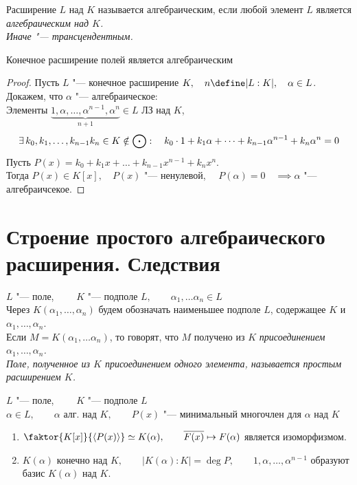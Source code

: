 \begin{definition}
	Расширение $ L $ над $ K $ называется алгебраическим, если любой элемент $ L $ является \it{алгебраическим} над $ K $. \\
	Иначе "--- \it{трансцендентным}.
\end{definition}

\begin{theorem}
	Конечное расширение полей является алгебраическим
\end{theorem}

\begin{proof}
	Пусть $ L $ "--- конечное расширение $ K, \quad n \define |L : K|, \quad \alpha \in L $. \\
	Докажем, что $ \alpha $ "--- алгебраическое: \\
	Элементы $ \underbrace{1, \alpha, \dots, \alpha^{n - 1}, \alpha^n}_{n + 1} \in L $ ЛЗ над $ K $, \ie
	$$ \exists\, k_0, k_1, \dots, k_{n - 1} k_n \in K \notin \bigodot : \quad k_0 \cdot 1 + k_1 \alpha + \dots + k_{n - 1}\alpha^{n - 1} + k_n\alpha^n = 0 $$
	Пусть $ P(x) = k_0 + k_1x + \dots + k_{n - 1}x^{n - 1} + k_nx^n $. \\
	Тогда $ P(x) \in K[x], \quad P(x) $ "--- ненулевой, $ \quad P(\alpha) = 0 \quad \implies \alpha $ "--- алгебраичсекое.
\end{proof}

\section{Строение простого алгебраического расширения. Следствия}

\begin{definition}
	$ L $ "--- поле, $ \qquad K $ "--- подполе $ L, \qquad \alpha_1, \dots \alpha_n \in L $ \\
	Через $ K(\alpha_1, \dots, \alpha_n) $ будем обозначать наименьшее подполе $ L $, содержащее $ K $ и $ \alpha_1, \dots, \alpha_n $. \\
	Если $ M = K(\alpha_1, \dots \alpha_n) $, то говорят, что $ M $ получено из $ K $ \it{присоединением} $ \alpha_1, \dots, \alpha_n $. \\
	Поле, полученное из $ K $ присоединением одного элемента, называется \it{простым расширением} $ K $.
\end{definition}

\begin{theorem}
	$ L $ "--- поле, $ \qquad K $ "--- подполе $ L $ \\
	$ \alpha \in L, \qquad \alpha $ алг. над $ K, \qquad P(x) $ "--- минимальный многочлен для $ \alpha $ над $ K $
	\begin{enumerate}
		\item $ \faktor{K[x]}{\braket{P(x)}} \simeq K(\alpha), \qquad \ol{F(x)} \mapsto F(\alpha) $ является изоморфизмом.
		\item $ K(\alpha) $ конечно над $ K, \qquad |K(\alpha) : K| = \deg P, \qquad 1, \alpha, \dots, \alpha^{n - 1} $ образуют базис $ K(\alpha) $ над $ K $.
	\end{enumerate}
\end{theorem}

